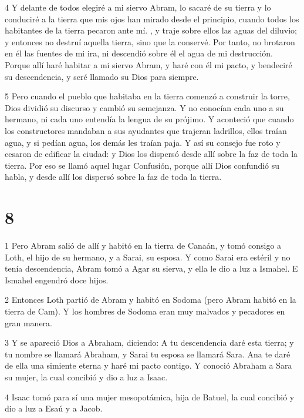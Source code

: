 \par 4 Y delante de todos elegiré a mi siervo Abram, lo sacaré de su tierra y lo conduciré a la tierra que mis ojos han mirado desde el principio, cuando todos los habitantes de la tierra pecaron ante mí. , y traje sobre ellos las aguas del diluvio; y entonces no destruí aquella tierra, sino que la conservé. Por tanto, no brotaron en él las fuentes de mi ira, ni descendió sobre él el agua de mi destrucción. Porque allí haré habitar a mi siervo Abram, y haré con él mi pacto, y bendeciré su descendencia, y seré llamado su Dios para siempre.

\par 5 Pero cuando el pueblo que habitaba en la tierra comenzó a construir la torre, Dios dividió su discurso y cambió su semejanza. Y no conocían cada uno a su hermano, ni cada uno entendía la lengua de su prójimo. Y aconteció que cuando los constructores mandaban a sus ayudantes que trajeran ladrillos, ellos traían agua, y si pedían agua, los demás les traían paja. Y así su consejo fue roto y cesaron de edificar la ciudad: y Dios los dispersó desde allí sobre la faz de toda la tierra. Por eso se llamó aquel lugar Confusión, porque allí Dios confundió su habla, y desde allí los dispersó sobre la faz de toda la tierra.

\chapter{8}

\par 1 Pero Abram salió de allí y habitó en la tierra de Canaán, y tomó consigo a Loth, el hijo de su hermano, y a Sarai, su esposa. Y como Sarai era estéril y no tenía descendencia, Abram tomó a Agar su sierva, y ella le dio a luz a Ismahel. E Ismahel engendró doce hijos.

\par 2 Entonces Loth partió de Abram y habitó en Sodoma (pero Abram habitó en la tierra de Cam). Y los hombres de Sodoma eran muy malvados y pecadores en gran manera.

\par 3 Y se apareció Dios a Abraham, diciendo: A tu descendencia daré esta tierra; y tu nombre se llamará Abraham, y Sarai tu esposa se llamará Sara. Ana te daré de ella una simiente eterna y haré mi pacto contigo. Y conoció Abraham a Sara su mujer, la cual concibió y dio a luz a Isaac.

\par 4 Isaac tomó para sí una mujer mesopotámica, hija de Batuel, la cual concibió y dio a luz a Esaú y a Jacob.

